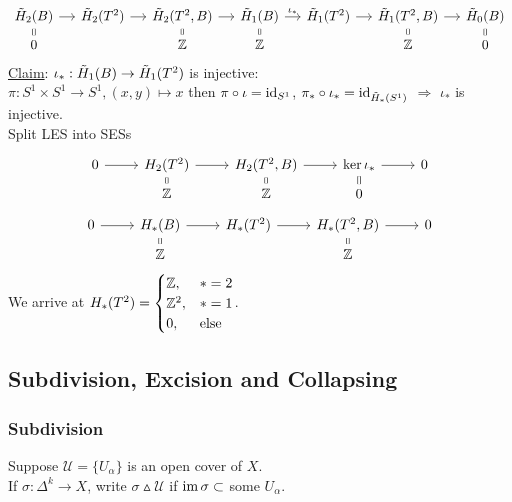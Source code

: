 \documentclass[a4paper,11pt]{article}
\begin{document}
\begin{eg}
\begin{equation*}
\begin{tikzcd}[column sep=small,row sep=tiny]
							\rhg[2]{B}\ar[d,equal]\ar[r]& \rhg[2]{T^2}\ar[r]& \rhg[2]{T^2,B}\ar[d,equal]\ar[r]& \rhg[1]{B}\ar[d,equal]\ar[r,"\iota_\ast"]& \rhg[1]{T^2}\ar[r]& \rhg[1]{T^2,B}\ar[d,equal]\ar[r]& \rhg[0]{B}\ar[d,equal]\\
							0 & & \Z & \Z & & \Z & 0
						\end{tikzcd}
					\end{equation*}
					\underline{Claim}: $\iota_\ast:\rhg[1]{B}\rightarrow \rhg[1]{T^2}$ is injective:\\
					$\pi:S^1\times S^1\rightarrow S^1, (x,y)\mapsto x$ then $\pi\circ\iota=\id_{S^1}$, $\pi_\ast\circ\iota_\ast=\id_{\rhg{S^1}}$ $\Rightarrow$ $\iota_\ast$ is injective.\\
					Split LES into SESs
					\begin{equation*}
						\begin{tikzcd}[row sep=tiny]
							0\ar[r]& \hg[2]{T^2}\ar[d,equal]\ar[r]& \hg[2]{T^2,B}\ar[d,equal]\ar[r]& \ker\iota_\ast\ar[d,equal]\ar[r]& 0\\
							& \Z & \Z & 0 &
						\end{tikzcd}
					\end{equation*}
					\begin{equation*}
						\begin{tikzcd}[row sep=tiny]
							0\ar[r]& \hg{B}\ar[d,equal]\ar[r]& \hg{T^2}\ar[r]& \hg{T^2,B}\ar[d,equal]\ar[r]& 0\\
							& \Z & & \Z & 
						\end{tikzcd}
					\end{equation*}
					We arrive at $\hg{T^2}=\begin{cases}
						\Z,&\ast=2\\\Z^2,& \ast=1\\0,&\text{else}
					\end{cases}$.
				\end{eg}

			
		\subsection{Subdivision, Excision and Collapsing}
			\subsubsection*{Subdivision}
				Suppose $\mathcal{U}=\{U_\alpha\}$ is an open cover of $X$.
				\vspace{1em}\\
				 If $\sigma:\Delta^k\rightarrow X$, write $\sigma\vartriangle \mathcal{U}$ if $\im\sigma\subset$ some $U_\alpha$.
\end{document}

